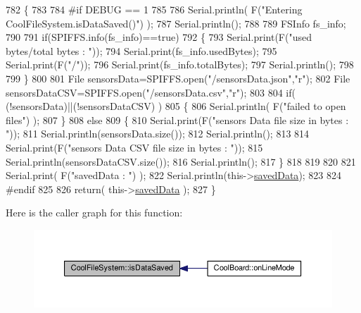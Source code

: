\begin{DoxyCode}
782 \{
783 
784 \textcolor{preprocessor}{#if DEBUG == 1 }
785 
786     Serial.println( F(\textcolor{stringliteral}{"Entering CoolFileSystem.isDataSaved()"}) );
787     Serial.println();
788 
789     FSInfo fs\_info;
790 
791     \textcolor{keywordflow}{if}(SPIFFS.info(fs\_info)==\textcolor{keyword}{true})
792     \{
793         Serial.print(F(\textcolor{stringliteral}{"used bytes/total bytes : "}));   
794         Serial.print(fs\_info.usedBytes);
795         Serial.print(F(\textcolor{stringliteral}{"/"}));
796         Serial.print(fs\_info.totalBytes);
797         Serial.println();
798 
799     \}
800 
801     File sensorsData=SPIFFS.open(\textcolor{stringliteral}{"/sensorsData.json"},\textcolor{stringliteral}{"r"});
802     File sensorsDataCSV=SPIFFS.open(\textcolor{stringliteral}{"/sensorsData.csv"},\textcolor{stringliteral}{"r"});
803     
804     \textcolor{keywordflow}{if}( (!sensorsData)||(!sensorsDataCSV) ) 
805     \{
806         Serial.println( F(\textcolor{stringliteral}{"failed to open files"}) );        
807     \}
808     \textcolor{keywordflow}{else}
809     \{       
810             Serial.print(F(\textcolor{stringliteral}{"sensors Data file size in bytes : "}));
811             Serial.println(sensorsData.size());
812             Serial.println();
813             
814             Serial.print(F(\textcolor{stringliteral}{"sensors Data CSV file size in bytes : "}));              
815             Serial.println(sensorsDataCSV.size());
816             Serial.println();
817     \}
818 
819 
820 
821     Serial.print( F(\textcolor{stringliteral}{"savedData : "}) );
822     Serial.println(this->\hyperlink{class_cool_file_system_ad9f5b739a32100f5f21270c3d9ee2b1d}{savedData});
823 
824 \textcolor{preprocessor}{#endif}
825 
826     \textcolor{keywordflow}{return}( this->\hyperlink{class_cool_file_system_ad9f5b739a32100f5f21270c3d9ee2b1d}{savedData} );
827 \}
\end{DoxyCode}
Here is the caller graph for this function\+:\nopagebreak
\begin{figure}[H]
\begin{center}
\leavevmode
\includegraphics[width=350pt]{db/d0c/class_cool_file_system_ac86a40e7c3a1842f7342f698d34324f9_icgraph}
\end{center}
\end{figure}
\mbox{\label{class_cool_file_system_afa3a4feae94871d4d3b6bebb701c2e67}} 
